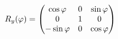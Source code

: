 \documentclass[preview]{standalone}
\begin{document}
\begin{align*}
\special{dvisvgm:raw <g id='unique000'>}R_y(\varphi)=\begin{pmatrix}\cos\varphi&0&\sin\varphi\\0&1&0\\-\sin\varphi&0&\cos\varphi\end{pmatrix}\special{dvisvgm:raw </g>}
\end{align*}
\end{document}
